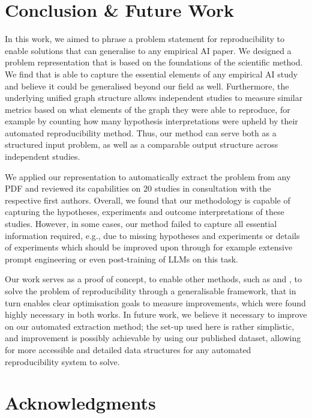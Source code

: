\documentclass[letterpaper]{article} %
\begin{document}
\section{Conclusion \& Future Work}

In this work, we aimed to phrase a problem statement for reproducibility to enable solutions that can generalise to any empirical AI paper. We designed a problem representation that is based on the foundations of the scientific method. We find that is able to capture the essential elements of any empirical AI study and believe it could be generalised beyond our field as well. Furthermore, the underlying unified graph structure allows independent studies to measure similar metrics based on what elements of the graph they were able to reproduce, for example by counting how many hypothesis interpretations were upheld by their automated reproducibility method. Thus, our method can serve both as a structured input problem, as well as a comparable output structure across independent studies.

We applied our representation to automatically extract the problem from any PDF and reviewed its capabilities on $20$ studies in consultation with the respective first authors. Overall, we found that our methodology is capable of capturing the hypotheses, experiments and outcome interpretations of these studies. However, in some cases, our method failed to capture all essential information required, e.g., due to missing hypotheses and experiments or details of experiments which should be improved upon through for example extensive prompt engineering or even post-training of LLMs on this task.

Our work serves as  a proof of concept, to enable other methods, such as \citet{starace_paperbench_2025} and \citet{bhaskar_reproscreener_2024}, to solve the problem of reproducibility through a generalisable framework, that in turn enables clear optimisation goals to measure improvements, which were found highly necessary in both works. In future work, we believe it necessary to improve on our automated extraction method; the set-up used here is rather simplistic, and improvement is possibly achievable by using our published dataset, allowing for more accessible and detailed data structures for any automated reproducibility system to solve.

\section{Acknowledgments}
\end{document}

